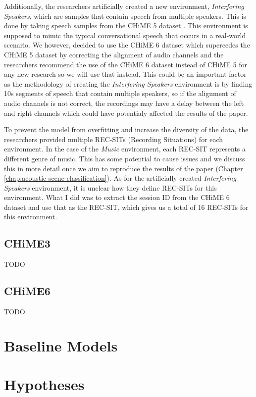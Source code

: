 \documentclass[logo,bsc,singlespacing,parskip,online]{infthesis}
\begin{document}
Additionally, the researchers artificially created a new environment, \textit{Interfering Speakers}, which are samples that contain speech from multiple speakers. 
This is done by taking speech samples from the CHiME 5 dataset \cite{barker18_fifth_2018}. This environment is supposed to mimic the 
typical conversational speech that occurs in a real-world scenario. We however, decided to use the CHiME 6 dataset which 
supercedes the CHiME 5 dataset \cite{barker18_fifth_2018} by correcting the alignment of audio channels and the researchers 
recommend the use of the CHiME 6 dataset instead of CHiME 5 for any new research so we will use that instead. This could 
be an important factor as the methodology of creating the \textit{Interfering Speakers} environment is by finding 10s 
segments of speech that contain multiple speakers, so if the alignment of audio channels is not correct, the recordings 
may have a delay between the left and right channels which could have potentialy affected the results of the paper.

To prevent the model from overfitting and increase the diversity of the data, the researchers provided multiple REC-SITs (Recording Situations) for each environment.
In the case of the \textit{Music} environment, each REC-SIT represents a different genre of music. This has some potential to cause issues 
and we discuss this in more detail once we aim to reproduce the results of the paper (Chapter \ref{chap:acoustic-scene-classification}). 
As for the artificially created \textit{Interfering Speakers} environment, it is unclear how they define REC-SITs for this environment. 
What I did was to extract the session ID from the CHiME 6 dataset and use that as the REC-SIT, which 
gives us a total of 16 REC-SITs for this environment.


\subsection{CHiME3}
TODO
\subsection{CHiME6}
TODO

\section{Baseline Models}

\section{Hypotheses}
\end{document}
